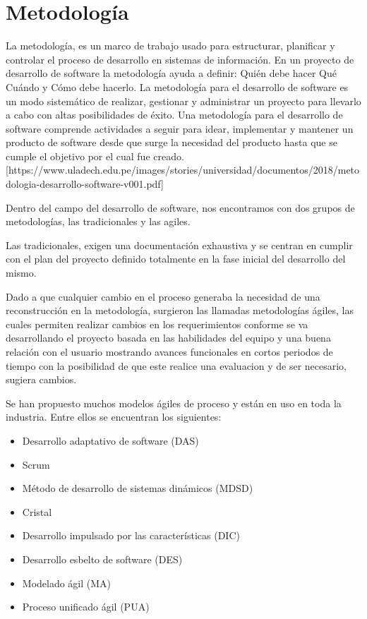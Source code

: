 \section{Metodología}

La metodología, es un marco de trabajo usado para estructurar, planificar y controlar el proceso de desarrollo en sistemas de información. En un proyecto de desarrollo de software la metodología ayuda a definir: Quién debe hacer Qué Cuándo y Cómo debe hacerlo. La metodología para el desarrollo de software es un modo sistemático de realizar, gestionar y administrar un proyecto para llevarlo a cabo con altas posibilidades de éxito. Una metodología para el desarrollo de software comprende actividades a seguir para idear, implementar y mantener un producto de software desde que surge la necesidad del producto hasta que se cumple el objetivo por el cual fue creado.[https://www.uladech.edu.pe/images/stories/universidad/documentos/2018/metodologia-desarrollo-software-v001.pdf]

Dentro del campo del desarrollo de software, nos encontramos con dos grupos de metodologías, las tradicionales y las agiles.


Las tradicionales, exigen una documentación exhaustiva y se centran en cumplir con el plan del proyecto definido totalmente en la fase inicial del desarrollo del mismo.


Dado a que cualquier cambio en el proceso generaba la necesidad de una reconstrucción en la metodología, surgieron las llamadas metodologías ágiles, las cuales permiten realizar cambios en los requerimientos conforme se va desarrollando el proyecto basada en las habilidades del equipo y una buena relación con el usuario mostrando avances funcionales en cortos periodos de tiempo con la posibilidad de que este realice una evaluacion y de ser necesario, sugiera cambios.

Se han propuesto muchos modelos ágiles de proceso y están en uso en toda la industria. Entre ellos se encuentran los siguientes:


\begin{itemize}
	\item Desarrollo adaptativo de software (DAS)
	\item Scrum
	\item Método de desarrollo de sistemas dinámicos (MDSD)
	\item Cristal
	\item Desarrollo impulsado por las características (DIC)
	\item Desarrollo esbelto de software (DES)
	\item Modelado ágil (MA)
	\item Proceso unificado ágil (PUA)
\end{itemize}

